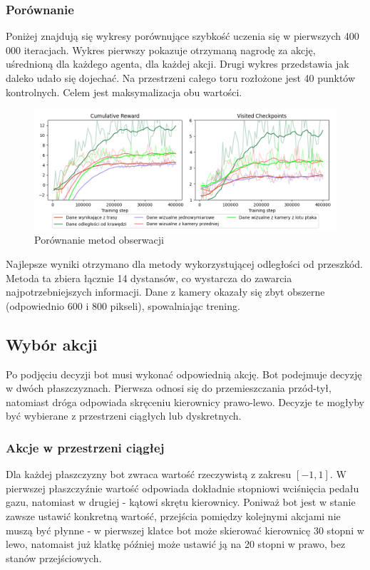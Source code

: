 \subsubsection{Porównanie}
Poniżej znajdują się wykresy porównujące szybkość uczenia się w pierwszych 400 000 iteracjach. Wykres pierwszy pokazuje otrzymaną nagrodę za akcję, uśrednioną dla każdego agenta, dla każdej akcji. Drugi wykres przedstawia jak daleko udało się dojechać. Na przestrzeni całego toru rozłożone jest 40 punktów kontrolnych. Celem jest maksymalizacja obu wartości.
\begin{figure}[H]
    \centering
    \includegraphics[width=\textwidth]{graphs/input_observations}
    \caption{Porównanie metod obserwacji}
    \label{fig}
\end{figure}
Najlepsze wyniki otrzymano dla metody wykorzystującej odległości od przeszkód. Metoda ta zbiera łącznie 14 dystansów, co wystarcza do zawarcia najpotrzebniejszych informacji. Dane z kamery okazały się zbyt obszerne (odpowiednio 600 i 800 pikseli), spowalniając trening.
\clearpage
\subsection{Wybór akcji}
Po podjęciu decyzji bot musi wykonać odpowiednią akcję. Bot podejmuje decyzję w dwóch płaszczyznach. Pierwsza odnosi się do przemieszczania przód-tył, natomiast dróga odpowiada skręceniu kierownicy prawo-lewo. Decyzje te mogłyby być wybierane z przestrzeni ciągłych lub dyskretnych.

\subsubsection{Akcje w przestrzeni ciągłej}
Dla każdej płaszczyzny bot zwraca wartość rzeczywistą z zakresu $[-1, 1]$. W pierwszej płaszczyźnie wartość odpowiada dokładnie stopniowi wciśnięcia pedału gazu, natomiast w drugiej - kątowi skrętu kierownicy. Poniważ bot jest w stanie zawsze ustawić konkretną wartość, przejścia pomiędzy kolejnymi akcjami nie muszą być płynne - w pierwszej klatce bot może skierować kierownicę 30 stopni w lewo, natomaist już klatkę później może ustawić ją na 20 stopni w prawo, bez stanów przejściowych.

